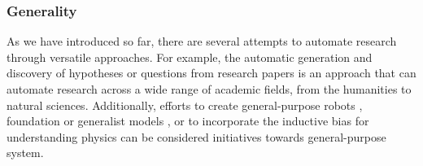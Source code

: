 




\subsubsection{Generality}
As we have introduced so far, there are several attempts to automate research through versatile approaches. For example, the automatic generation and discovery of hypotheses \cite{kang2022augmenting,chan2018solvent,wang2023learning,xu2023exploring} or questions \cite{lahat2023evaluating,liu2023creative,oppenlaender2023mapping,surita2020can} from research papers is an approach that can automate research across a wide range of academic fields, from the humanities to natural sciences. Additionally, efforts to create general-purpose robots  \cite{yachie2017robotic}, foundation or generalist models \cite{singhal2023towards,taylor2022galactica}, or to incorporate the inductive bias for understanding physics can be considered initiatives towards general-purpose system.


